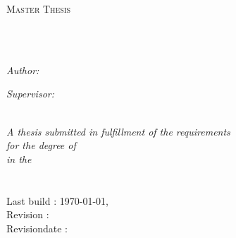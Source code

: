 
\begin{titlepage}
\begin{center}

{\scshape\LARGE \univname\par}\vspace{1.5cm} %
\textsc{\Large Master Thesis}\\[0.5cm] %

\HRule \\[0.4cm] %
{\huge \bfseries \ttitle\par}\vspace{0.4cm} %
\HRule \\[1.5cm] %
 
\begin{minipage}[t]{0.4\textwidth}
\begin{flushleft} \large
\emph{Author:}\\
\authorname
\end{flushleft}
\end{minipage}
\begin{minipage}[t]{0.4\textwidth}
\begin{flushright} \large
\emph{Supervisor:} \\
\supname  
\end{flushright}
\end{minipage}\\[3cm]
 
\large \textit{A thesis submitted in fulfillment of the requirements\\ for the degree of \degreename}\\[0.3cm] %
\textit{in the}\\[0.4cm]
\univname\\\deptname\\[2cm] %

\renewcommand{\dateseparator}{-}
{Last build : \large \today, \currenttime}\\[0cm] %
{Revision : \revision}\\[0cm] %
{Revisiondate : \revisiondate}\\[4cm] %

 
\vfill
\end{center}
\end{titlepage}